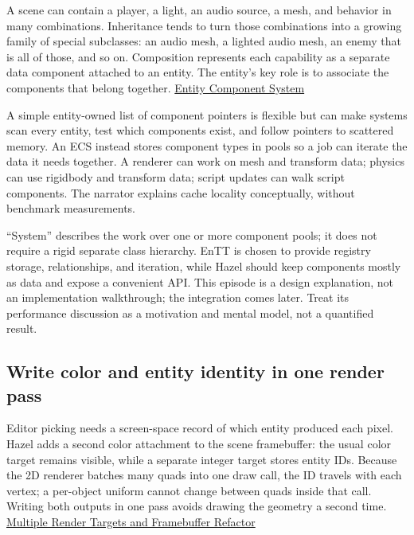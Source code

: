 \hypertarget{06-engine-ii-ch031-use-component-pools-for-the-work-a-system-needs}{}

A scene can contain a player, a light, an audio source, a mesh, and behavior in many combinations. Inheritance tends to turn those combinations into a growing family of special subclasses: an audio mesh, a lighted audio mesh, an enemy that is all of those, and so on. Composition represents each capability as a separate data component attached to an entity. The entity's key role is to associate the components that belong together. \href{https://www.youtube.com/watch?v=Z-CILn2w9K0}{Entity Component System}

A simple entity-owned list of component pointers is flexible but can make systems scan every entity, test which components exist, and follow pointers to scattered memory. An ECS instead stores component types in pools so a job can iterate the data it needs together. A renderer can work on mesh and transform data; physics can use rigidbody and transform data; script updates can walk script components. The narrator explains cache locality conceptually, without benchmark measurements.

``System'' describes the work over one or more component pools; it does not require a rigid separate class hierarchy. EnTT is chosen to provide registry storage, relationships, and iteration, while Hazel should keep components mostly as data and expose a convenient API. This episode is a design explanation, not an implementation walkthrough; the integration comes later. Treat its performance discussion as a motivation and mental model, not a quantified result.

\subsection{Write color and entity identity in one render pass}\label{06-engine-ii-ch031-write-color-and-entity-identity-in-one-render-pass}

\hypertarget{06-engine-ii-ch031-write-color-and-entity-identity-in-one-render-pass}{}

Editor picking needs a screen-space record of which entity produced each pixel. Hazel adds a second color attachment to the scene framebuffer: the usual color target remains visible, while a separate integer target stores entity IDs. Because the 2D renderer batches many quads into one draw call, the ID travels with each vertex; a per-object uniform cannot change between quads inside that call. Writing both outputs in one pass avoids drawing the geometry a second time. \href{https://www.youtube.com/watch?v=f-GbHye1VFQ}{Multiple Render Targets and Framebuffer Refactor}

